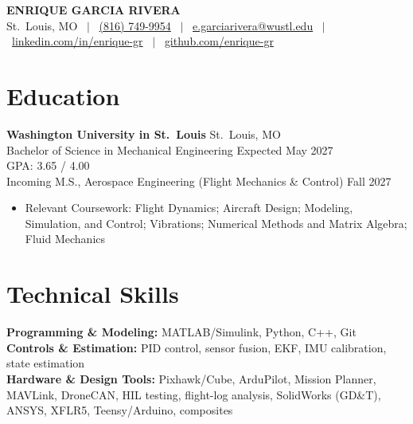 \documentclass[11pt, letterpaper]{article}
\newcommand{\myphone}{(816) 749-9954}
\begin{document}
\begin{center}
{\fontsize{18pt}{22pt}\selectfont\bfseries ENRIQUE GARCIA RIVERA} \\[4pt]
\small
St.\ Louis, MO \ $|$ \ \href{tel:+18167499954}{\myphone} \ $|$ \
\href{mailto:e.garciarivera@wustl.edu}{e.garciarivera@wustl.edu} \ $|$ \
\href{https://www.linkedin.com/in/enrique-gr}{linkedin.com/in/enrique-gr} \ $|$ \
\href{https://github.com/enrique-gr}{github.com/enrique-gr}
\end{center}
\section{Education}
\textbf{Washington University in St.\ Louis} \hfill St.\ Louis, MO \\
Bachelor of Science in Mechanical Engineering \hfill Expected May 2027 \\
GPA: 3.65 / 4.00 \\
Incoming M.S., Aerospace Engineering (Flight Mechanics \& Control) \hfill Fall 2027
\begin{itemize}
\item Relevant Coursework: Flight Dynamics; Aircraft Design; Modeling, Simulation, and Control; Vibrations; Numerical Methods and Matrix Algebra; Fluid Mechanics
\end{itemize}
\section{Technical Skills}
\textbf{Programming \& Modeling:} MATLAB/Simulink, Python, C++, Git \\
\textbf{Controls \& Estimation:} PID control, sensor fusion, EKF, IMU calibration, state estimation \\
\textbf{Hardware \& Design Tools:} Pixhawk/Cube, ArduPilot, Mission Planner, MAVLink, DroneCAN, HIL testing, flight-log analysis, SolidWorks (GD\&T), ANSYS, XFLR5, Teensy/Arduino, composites
\end{document}
